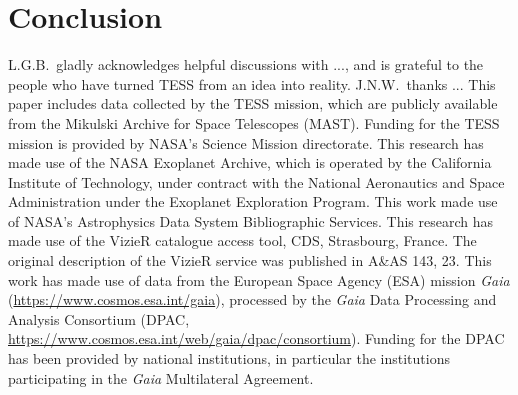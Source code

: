 \documentclass[12pt,twocolumn,tighten]{aastex62}
\begin{document}
\section{Conclusion}
\label{sec:conclusion}





\acknowledgements
L.G.B.\ gladly acknowledges helpful discussions with
..., and is
grateful to the people who have turned TESS from an idea into reality.
%
J.N.W.\ thanks ...
%
This paper includes data collected by the TESS mission, which are
publicly available from the Mikulski Archive for Space Telescopes
(MAST).
%
Funding for the TESS mission is provided by NASA's Science Mission
directorate.
%
This research has made use of the NASA Exoplanet Archive, which is
operated by the California Institute of Technology, under contract
with the National Aeronautics and Space Administration under the
Exoplanet Exploration Program.
%
This work made use of NASA's Astrophysics Data System Bibliographic
Services.
%
This research has made use of the VizieR catalogue access tool, CDS,
Strasbourg, France. The original description of the VizieR service was
published in A\&AS 143, 23.
%
This work has made use of data from the European Space Agency (ESA)
mission {\it Gaia} (\url{https://www.cosmos.esa.int/gaia}), processed
by the {\it Gaia} Data Processing and Analysis Consortium (DPAC,
\url{https://www.cosmos.esa.int/web/gaia/dpac/consortium}). Funding
for the DPAC has been provided by national institutions, in particular
the institutions participating in the {\it Gaia} Multilateral
Agreement.
%
\newline
%
%

                            
 

\end{document}
